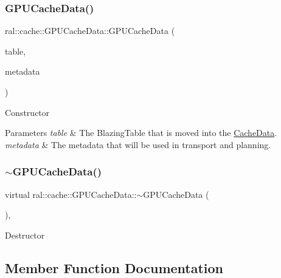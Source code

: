 \subsubsection{\texorpdfstring{G\+P\+U\+Cache\+Data()}{GPUCacheData()}\hspace{0.1cm}{\footnotesize\ttfamily [2/2]}}
{\footnotesize\ttfamily ral\+::cache\+::\+G\+P\+U\+Cache\+Data\+::\+G\+P\+U\+Cache\+Data (\begin{DoxyParamCaption}\item[{std\+::unique\+\_\+ptr$<$ \hyperlink{classral_1_1frame_1_1BlazingTable}{ral\+::frame\+::\+Blazing\+Table} $>$}]{table,  }\item[{const \hyperlink{classral_1_1cache_1_1MetadataDictionary}{Metadata\+Dictionary} \&}]{metadata }\end{DoxyParamCaption})\hspace{0.3cm}{\ttfamily [inline]}}

Constructor 
\begin{DoxyParams}{Parameters}
{\em table} & The Blazing\+Table that is moved into the \hyperlink{classral_1_1cache_1_1CacheData}{Cache\+Data}. \\
\hline
{\em metadata} & The metadata that will be used in transport and planning. \\
\hline
\end{DoxyParams}
\mbox{\label{classral_1_1cache_1_1GPUCacheData_ad592cf9835ac4b7f0056a8a1e7f0fe10}} 
\subsubsection{\texorpdfstring{$\sim$\+G\+P\+U\+Cache\+Data()}{~GPUCacheData()}}
{\footnotesize\ttfamily virtual ral\+::cache\+::\+G\+P\+U\+Cache\+Data\+::$\sim$\+G\+P\+U\+Cache\+Data (\begin{DoxyParamCaption}{ }\end{DoxyParamCaption})\hspace{0.3cm}{\ttfamily [inline]}, {\ttfamily [virtual]}}

Destructor 

\subsection{Member Function Documentation}
\mbox{\label{classral_1_1cache_1_1GPUCacheData_a7efe1d821067ba5266df18adb701bf5f}} 
